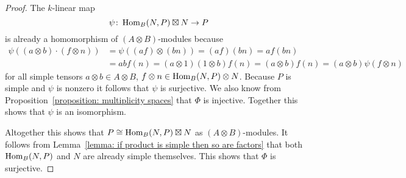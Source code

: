 \begin{proof}
  The $k$-linear map
  \[
            \psi
    \colon  \operatorname{Hom}_B(N,P) \boxtimes N
    \to     P
  \]
  is already a homomorphism of $(A \otimes B)$-modules because
  \begin{align*}
        \psi((a \otimes b) \cdot (f \otimes n))
    &=  \psi((af) \otimes (bn))
     =  (af)(bn)
     =  a f(bn) \\
    &=  a b f(n)
     =  (a \otimes 1)(1 \otimes b) f(n)
     =  (a \otimes b) f(n)
     =  (a \otimes b) \psi(f \otimes n)
  \end{align*}
  for all simple tensors $a \otimes b \in A \otimes B$, $f \otimes n \in \operatorname{Hom}_B(N,P) \otimes N$.
  Because $P$ is simple and $\psi$ is nonzero it follows that $\psi$ is surjective.
  We also know from Proposition~\ref{proposition: multiplicity spaces} that $\Phi$ is injective.
  Together this shows that $\psi$ is an isomorphism.
  
  Altogether this shows that $P \cong \operatorname{Hom}_B(N,P) \boxtimes N$ as $(A \otimes B)$-modules.
  It follows from Lemma~\ref{lemma: if product is simple then so are factors} that both $\operatorname{Hom}_B(N,P)$ and $N$ are already simple themselves.
  This shows that $\Phi$ is surjective.
\end{proof}




